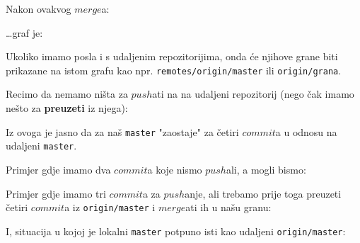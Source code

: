 
Nakon ovakvog $merge$a:



\dots{}graf je:



Ukoliko imamo posla i s udaljenim repozitorijima, onda će njihove grane biti prikazane na istom grafu kao npr. \verb+remotes/origin/master+ ili \verb+origin/grana+.

Recimo da nemamo ništa za $push$ati na na udaljeni repozitorij (nego čak imamo nešto za \textbf{preuzeti} iz njega):


Iz ovoga je jasno da za naš \verb+master+ "zaostaje" za četiri $commit$a u odnosu na udaljeni \verb+master+.

Primjer gdje imamo dva $commit$a koje nismo $push$ali, a mogli bismo:


Primjer gdje imamo tri $commit$a za $push$anje, ali trebamo prije toga preuzeti četiri $commit$a iz \verb+origin/master+ i $merge$ati ih u našu granu:


I, situacija u kojoj je lokalni \verb+master+ potpuno isti kao udaljeni \verb+origin/master+:


